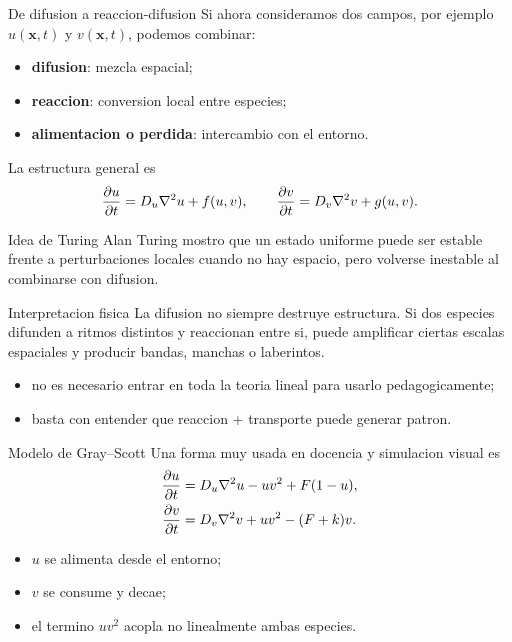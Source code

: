 \begin{frame}{De difusion a reaccion-difusion}
\justifying
Si ahora consideramos dos campos, por ejemplo $u(\bm{x},t)$ y $v(\bm{x},t)$, podemos combinar:

\begin{itemize}
    \item \textbf{difusion}: mezcla espacial;
    \item \textbf{reaccion}: conversion local entre especies;
    \item \textbf{alimentacion o perdida}: intercambio con el entorno.
\end{itemize}

La estructura general es
\[
\pdv{u}{t} = D_u \nabla^2 u + f(u,v),
\qquad
\pdv{v}{t} = D_v \nabla^2 v + g(u,v).
\]
\end{frame}

\begin{frame}{Idea de Turing}
\justifying
Alan Turing mostro que un estado uniforme puede ser estable frente a perturbaciones locales cuando no hay espacio, pero volverse inestable al combinarse con difusion.

\begin{block}{Interpretacion fisica}
La difusion no siempre destruye estructura. Si dos especies difunden a ritmos distintos y reaccionan entre si, puede amplificar ciertas escalas espaciales y producir bandas, manchas o laberintos.
\end{block}

\begin{itemize}
    \item no es necesario entrar en toda la teoria lineal para usarlo pedagogicamente;
    \item basta con entender que reaccion + transporte puede generar patron.
\end{itemize}
\end{frame}

\begin{frame}{Modelo de Gray--Scott}
Una forma muy usada en docencia y simulacion visual es
\begin{align*}
\pdv{u}{t} &= D_u \nabla^2 u - uv^2 + F(1-u), \\
\pdv{v}{t} &= D_v \nabla^2 v + uv^2 - (F+k)v.
\end{align*}

\begin{itemize}
    \item $u$ se alimenta desde el entorno;
    \item $v$ se consume y decae;
    \item el termino $uv^2$ acopla no linealmente ambas especies.
\end{itemize}
\end{frame}

